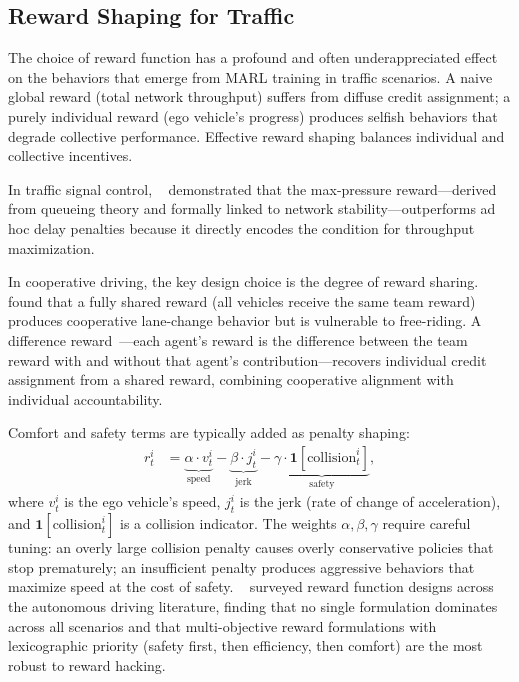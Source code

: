 \documentclass[12pt, a4paper]{article}
\begin{document}
\subsection{Reward Shaping for Traffic}

The choice of reward function has a profound and often underappreciated
effect on the behaviors that emerge from MARL training in traffic scenarios.
A naive global reward (total network throughput) suffers from diffuse credit
assignment; a purely individual reward (ego vehicle's progress) produces
selfish behaviors that degrade collective performance.  Effective reward
shaping balances individual and collective incentives.

In traffic signal control, \citeauthor{wei2019presslight}~\cite{wei2019presslight}
demonstrated that the max-pressure reward---derived from queueing theory and
formally linked to network stability---outperforms ad hoc delay penalties
because it directly encodes the condition for throughput maximization.

In cooperative driving, the key design choice is the degree of reward
sharing.  \citeauthor{wang2018urban}~\cite{wang2018urban} found that a
fully shared reward (all vehicles receive the same team reward) produces
cooperative lane-change behavior but is vulnerable to free-riding.
A difference reward~\cite{foerster2018counterfactual}---each agent's
reward is the difference between the team reward with and without that
agent's contribution---recovers individual credit assignment from a shared
reward, combining cooperative alignment with individual accountability.

Comfort and safety terms are typically added as penalty shaping:
\begin{align}
  r^i_t &= \underbrace{\alpha \cdot v^i_t}_{\text{speed}} -
           \underbrace{\beta \cdot j^i_t}_{\text{jerk}} -
           \underbrace{\gamma \cdot \mathbf{1}[\text{collision}^i_t]}_{\text{safety}},
\end{align}
where $v^i_t$ is the ego vehicle's speed, $j^i_t$ is the jerk (rate of change
of acceleration), and $\mathbf{1}[\text{collision}^i_t]$ is a collision
indicator.  The weights $\alpha, \beta, \gamma$ require careful tuning: an
overly large collision penalty causes overly conservative policies that stop
prematurely; an insufficient penalty produces aggressive behaviors that
maximize speed at the cost of safety.
\citeauthor{kiran2021deep}~\cite{kiran2021deep} surveyed reward function
designs across the autonomous driving literature, finding that no single
formulation dominates across all scenarios and that multi-objective reward
formulations with lexicographic priority (safety first, then efficiency, then
comfort) are the most robust to reward hacking.
\end{document}
